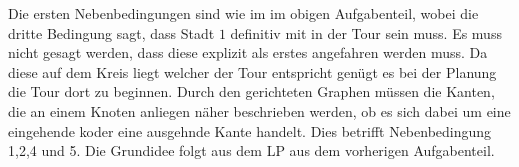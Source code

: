 \documentclass[10pt]{article}
\begin{document}
      Die ersten Nebenbedingungen sind wie im im obigen Aufgabenteil, wobei die
      dritte Bedingung sagt, dass Stadt $1$ definitiv mit in der Tour sein muss.
      Es muss nicht gesagt werden, dass diese explizit als erstes angefahren
      werden muss. Da diese auf dem Kreis liegt welcher der Tour entspricht
      genügt es bei der Planung die Tour dort zu beginnen.
      Durch den gerichteten Graphen müssen die Kanten, die an einem Knoten
      anliegen näher beschrieben werden, ob es sich dabei um eine eingehende
      koder eine ausgehnde Kante handelt. Dies betrifft Nebenbedingung
      1,2,4 und 5. Die Grundidee folgt aus dem LP aus dem vorherigen
      Aufgabenteil.
\end{document}
